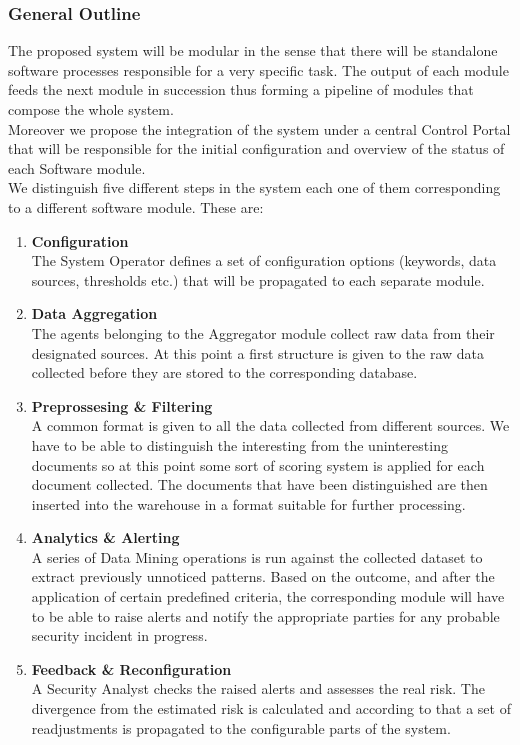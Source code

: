 \documentclass[12pt]{article}
\begin{document}
\subsubsection{General Outline}
The proposed system will be modular in the sense that there will be standalone software processes responsible for a very specific task. The output of each module feeds the next module in succession thus forming a pipeline of modules that compose the whole system. 
\hfill \break \\
Moreover we propose the integration of the system under a central Control Portal that will be responsible for the initial configuration and overview of the status of each Software module.
\hfill \break \\
We distinguish five different steps in the system each one of them corresponding to a different software module. These are:
\begin{enumerate}
	\item \textbf{Configuration}\\ 
	The System Operator defines a set of configuration options (keywords, data sources, thresholds etc.) that will be propagated to each separate module.
	\item \textbf{Data Aggregation}\\
	The agents belonging to the Aggregator module collect raw data from their designated sources. At this point a first structure is given to the raw data collected before they are stored to the corresponding database. 
	\item \textbf{Preprossesing \& Filtering}\\
	A common format is given to all the data collected from different sources. We have to be able to distinguish the interesting from the uninteresting documents so at this point some sort of scoring system is applied for each document collected. The documents that have been distinguished are then inserted into the warehouse in a format suitable for further processing.
	\item \textbf{Analytics \& Alerting}\\
	A series of Data Mining operations is run against the collected dataset to extract previously unnoticed patterns. Based on the outcome, and after the application of certain predefined criteria, the corresponding module will have to be able to raise alerts and notify the appropriate parties for any probable security incident in progress.
	\item \textbf{Feedback \& Reconfiguration}\\
	A Security Analyst checks the raised alerts and assesses the real risk. The divergence from the estimated risk is calculated and according to that a set of readjustments is propagated to the configurable parts of the system.
\end{enumerate}
\end{document}
